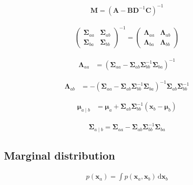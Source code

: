 \documentclass{article}
\begin{document}
\begin{align*}
\mathbf{M} = \left(\mathbf{A} - \mathbf{B D}^{-1} \mathbf{C}\right)^{-1}
\tag{3.61}
\end{align*}

\begin{align*}
\left(\begin{array}{ll}
\boldsymbol{\Sigma}_{a a} & \boldsymbol{\Sigma}_{a b} \\
\boldsymbol{\Sigma}_{b a} & \boldsymbol{\Sigma}_{b b}
\end{array}\right)^{-1} = \left(\begin{array}{ll}
\boldsymbol{\Lambda}_{a a} & \boldsymbol{\Lambda}_{a b} \\
\boldsymbol{\Lambda}_{b a} & \boldsymbol{\Lambda}_{b b}
\end{array}\right)
\tag{3.62}
\end{align*}

\begin{align*}
\boldsymbol{\Lambda}_{a a} & = \left(\boldsymbol{\Sigma}_{a a} - \boldsymbol{\Sigma}_{a b} \boldsymbol{\Sigma}_{b b}^{-1} \boldsymbol{\Sigma}_{b a}\right)^{-1}
\tag{3.63}
\end{align*}

\begin{align*}
\boldsymbol{\Lambda}_{a b} & = -\left(\boldsymbol{\Sigma}_{a a} - \boldsymbol{\Sigma}_{a b} \boldsymbol{\Sigma}_{b b}^{-1} \boldsymbol{\Sigma}_{b a}\right)^{-1} \boldsymbol{\Sigma}_{a b} \boldsymbol{\Sigma}_{b b}^{-1}
\tag{3.64}
\end{align*}

\begin{align*}
\boldsymbol{\mu}_{a \mid b} 
& = \boldsymbol{\mu}_{a} + \boldsymbol{\Sigma}_{a b} \boldsymbol{\Sigma}_{b b}^{-1} \left(\mathbf{x}_{b} - \boldsymbol{\mu}_{b}\right)
\tag{3.65}
\end{align*}

\begin{align*}
\boldsymbol{\Sigma}_{a \mid b} = \boldsymbol{\Sigma}_{a a} - \boldsymbol{\Sigma}_{a b} \boldsymbol{\Sigma}_{b b}^{-1} \boldsymbol{\Sigma}_{b a}
\tag{3.66}
\end{align*}

\subsection{Marginal distribution}

\begin{align*}
p\left(\mathbf{x}_{a}\right) = \int p\left(\mathbf{x}_{a}, \mathbf{x}_{b}\right) \, \mathrm{d} \mathbf{x}_{b} 
\tag{3.67}
\end{align*}
\end{document}
